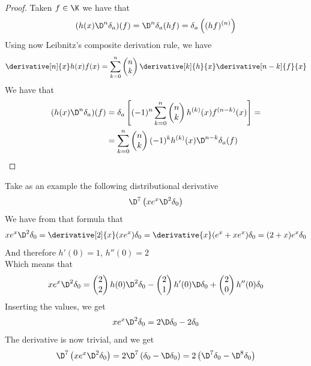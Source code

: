 \documentclass[../mmf.tex]{subfiles}
\begin{document}
\begin{proof}
	Taken $f\in\K$ we have that
	\begin{equation*}
		(h(x)\D^{n}\delta_a)(f)=\D^n\delta_a(hf)=\delta_a\left( (hf)^{(n)} \right)
	\end{equation*}
	Using now Leibnitz's composite derivation rule, we have
	\begin{equation*}
		\derivative[n]{x}h(x)f(x)=\sum_{k=0}^{n}\begin{pmatrix}n\\k\end{pmatrix}\derivative[k]{h}{x}\derivative[n-k]{f}{x}
	\end{equation*}
	We have that
	\begin{equation*}
		\begin{aligned}
			(h(x)\D^n\delta_a)(f)&=\delta_a\left[ (-1)^n\sum_{k=0}^{n}\begin{pmatrix}n\\k\end{pmatrix}h^{(k)}(x)f^{(n-k)}(x) \right]=\\
			&=\sum_{k=0}^n\begin{pmatrix}n\\k\end{pmatrix}(-1)^kh^{(k)}(x)\D^{n-k}\delta_a(f)
		\end{aligned}
	\end{equation*}
\end{proof}
\begin{eg}
	Take as an example the following distributional derivative
	\begin{equation*}
		\D^7\left( xe^x\D^2\delta_0 \right)
	\end{equation*}
	We have from that formula that
	\begin{equation*}
		xe^x\D^2\delta_0=\derivative[2]{x}(xe^x)\delta_0=\derivative{x}(e^x+xe^x)\delta_0=(2+x)e^x\delta_0
	\end{equation*}
	And therefore $h'(0)=1$, $h''(0)=2$\\
	Which means that
	\begin{equation*}
		xe^x\D^2\delta_0=\begin{pmatrix}2\\2\end{pmatrix}h(0)\D^2\delta_0-\begin{pmatrix}2\\1\end{pmatrix}h'(0)\D\delta_0+\begin{pmatrix}2\\0\end{pmatrix}h''(0)\delta_0
	\end{equation*}
	Inserting the values, we get
	\begin{equation*}
		xe^x\D^2\delta_0=2\D\delta_0-2\delta_0
	\end{equation*}
	The derivative is now trivial, and we get
	\begin{equation*}
		\D^7\left( xe^x\D^2\delta_0 \right)=2\D^7\left( \delta_0-\D\delta_0 \right)=2\left( \D^7\delta_0-\D^8\delta_0 \right)
	\end{equation*}
\end{eg}
\end{document}
